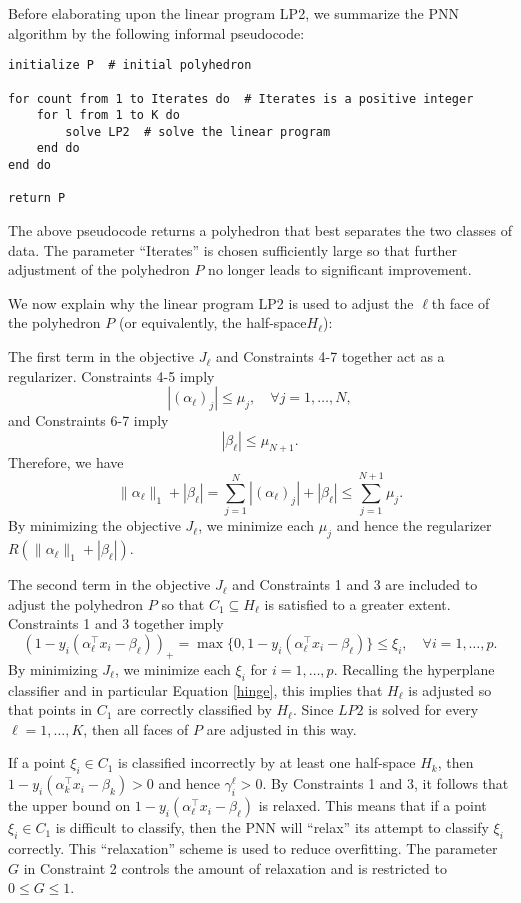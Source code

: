 \documentclass[12pt, a4paper, notitlepage]{report}
\begin{document}
Before elaborating upon the linear program LP2, we summarize the PNN algorithm by the following informal pseudocode:

\begin{verbatim}
initialize P  # initial polyhedron

for count from 1 to Iterates do  # Iterates is a positive integer
    for l from 1 to K do
        solve LP2  # solve the linear program
    end do
end do

return P
\end{verbatim}

The above pseudocode returns a polyhedron that best separates the two classes of data. The parameter ``Iterates'' is chosen sufficiently large so that further adjustment of the polyhedron $P$ no longer leads to significant improvement.

We now explain why the linear program LP2 is used to adjust the $\ell$th face of the polyhedron $P$ (or equivalently, the half-space$ H_\ell$):

The first term in the objective $J_\ell$ and Constraints 4-7 together act as a regularizer. Constraints 4-5 imply
\[ |(\alpha_\ell)_j| \leq \mu_j, \quad\forall j=1,\ldots,N, \]
and Constraints 6-7 imply
\[ |\beta_\ell| \leq \mu_{N+1}. \]
Therefore, we have
\[ \|\alpha_\ell\|_1+|\beta_\ell|
= \sum_{j=1}^N |(\alpha_\ell)_j| + |\beta_\ell| \leq \sum_{j=1}^{N+1}\mu_j. \]
By minimizing the objective $J_\ell$, we minimize each $\mu_j$ and hence the regularizer $R(\|\alpha_\ell\|_1+|\beta_\ell|)$.

The second term in the objective $J_\ell$ and Constraints 1 and 3 are included to adjust the polyhedron $P$ so that $C_1\subseteq H_\ell$ is satisfied to a greater extent. Constraints 1 and 3 together imply
\[ (1-y_i(\alpha_\ell^\top x_i-\beta_\ell))_+
= \max\{0, 1-y_i(\alpha_\ell^\top x_i-\beta_\ell)\} \leq \xi_i, \quad\forall i=1,\ldots,p. \]
By minimizing $J_\ell$, we minimize each $\xi_i$ for $i=1,\ldots,p$. Recalling the hyperplane classifier and in particular Equation \ref{hinge}, this implies that $H_\ell$ is adjusted so that points in $C_1$ are correctly classified by $H_\ell$. Since $LP2$ is solved for every $\ell=1,\ldots,K$, then all faces of $P$ are adjusted in this way.

If a point $\xi_i\in C_1$ is classified incorrectly by at least one half-space $H_k$, then $1-y_i(\alpha_k^\top x_i-\beta_k)>0$ and hence $\gamma_i^\ell >0$. By Constraints 1 and 3, it follows that the upper bound on $1-y_i(\alpha_\ell^\top x_i-\beta_\ell)$ is relaxed. This means that if a point $\xi_i\in C_1$ is difficult to classify, then the PNN will ``relax'' its attempt to classify $\xi_i$ correctly. This ``relaxation'' scheme is used to reduce overfitting. The parameter $G$ in Constraint 2 controls the amount of relaxation and is restricted to $0\leq G\leq 1$.
\end{document}

